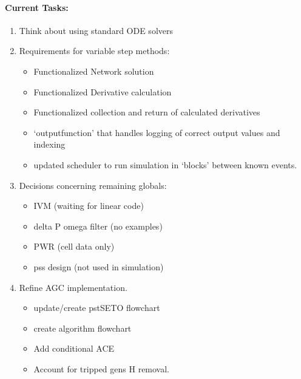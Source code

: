 \documentclass[12pt]{article}
\begin{document}
\begin{multicols}{2}
\paragraph{Current Tasks:}
	\begin{enumerate}
		\itemsep 0em 
		\item Think about using standard ODE solvers
				\item Requirements for variable step methods:
						\begin{minipage}{\linewidth}
							\begin{itemize}
								\itemsep0em 
								\footnotesize
								\item Functionalized Network solution
								\item Functionalized Derivative calculation
								\item Functionalized collection and return of calculated derivatives
								\item `outputfunction' that handles logging of correct output values and indexing
								\item updated scheduler to run simulation in `blocks' between known events.
							\end{itemize}
						\end{minipage}
		\item Decisions concerning remaining globals:
		\begin{minipage}{\linewidth}
						\begin{itemize}
				\itemsep0em 
						\footnotesize
							\item IVM (waiting for linear code)
							\item delta P omega filter (no examples)
							\item PWR (cell data only)
							\item pss design (not used in simulation)
						\end{itemize}
				\end{minipage}
		\item Refine AGC implementation.
		\begin{minipage}{\linewidth}
						\begin{itemize}
				\itemsep0em 
						\footnotesize
				\item update/create pstSETO flowchart
				\item create algorithm flowchart
				\item Add conditional ACE
				\item Account for tripped gens H removal.
							

\end{itemize}
\end{minipage}
\end{enumerate}
\end{multicols}
\end{document}
